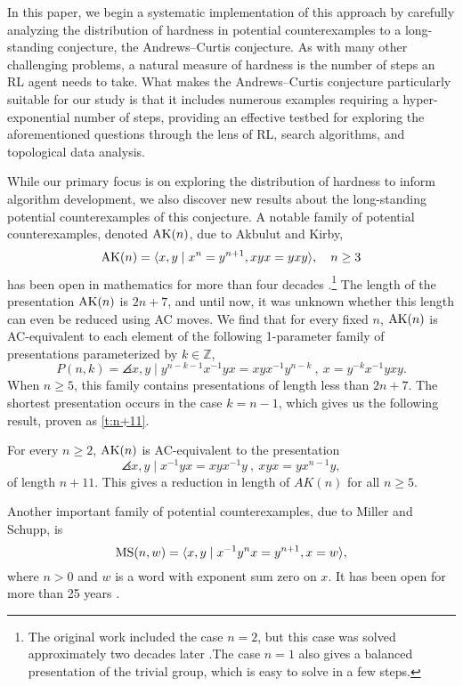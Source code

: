 In this paper, we begin a systematic implementation of this approach by carefully analyzing the distribution of hardness in potential counterexamples to a long-standing conjecture, the Andrews--Curtis conjecture. As with many other challenging problems, a natural measure of hardness is the number of steps an RL agent needs to take. What makes the Andrews--Curtis conjecture particularly suitable for our study is that it includes numerous examples requiring a hyper-exponential number of steps, providing an effective testbed for exploring the aforementioned questions through the lens of RL, search algorithms, and topological data analysis.

While our primary focus is on exploring the distribution of hardness to inform algorithm development, we also discover new results about the long-standing potential counterexamples of this conjecture. A notable family of potential counterexamples, denoted $\text{AK}(n)$, due to Akbulut and Kirby, 
\[
\text{AK}(n) = \langle x, y \mid x^n = y^{n+1}, xyx = yxy\rangle, \quad n \geq 3
\]
has been open in mathematics for more than four decades \cite{Akbulut--Kirby}.\footnote{The original work included the case $n=2$, but this case was solved approximately two decades later \cite{genetic}.The case $n=1$ also gives a balanced presentation of the trivial group, which is easy to solve in a few steps.}
The length of the presentation $\text{AK}(n)$ is $2n + 7$, and until now, it was unknown whether this length can even be reduced using AC moves. We find that for every fixed $n$, $\text{AK}(n)$ is AC-equivalent to each element of the following 1-parameter family of presentations parameterized by $k \in \mathbb{Z}$,
\[
P(n, k) = \angles{x, y \mid  y^{n-k-1}  x^{-1} y x = x y x^{-1} y^{n-k} \ , \ x = y^{-k} x^{-1} y x y }.
\]
When $n \geq 5$, this family contains presentations of length less than $2n + 7$. The shortest presentation occurs in the case $k=n-1$, which gives us the following result, proven as \cref{t:n+11}.

\begin{introtheorem}
	For every $n\geq 2$, $\text{AK}(n)$ is AC-equivalent to the presentation
	\[
	\angles{ x,y \mid x^{-1} y x = x y x^{-1} y \ ,\  xyx=yx^{n-1}y },
	\]
	of length $n+11$. This gives a reduction in length of $AK(n)$ for all $n \geq 5$.
\end{introtheorem}

Another important family of potential counterexamples, due to Miller and Schupp, is
\[
\text{MS}(n, w) = \langle x, y \mid x^{-1} y^n x = y^{n+1}, x = w\rangle,
\]
where $n > 0$ and $w$ is a word with exponent sum zero on $x$. 
It has been open for more than 25 years \cite{Miller--Schupp}.

